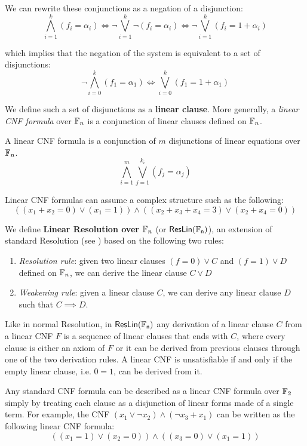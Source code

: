 \noindent
We can rewrite these conjunctions as a negation of a disjunction:
\[\bigwedge_{i = 1}^k (f_i = \alpha_i) \iff \lnot \bigvee_{i = 1}^k \lnot (f_i = \alpha_i) \iff \lnot \bigvee_{i = 1}^k (f_i = 1 + \alpha_i)\]

\noindent
which implies that the negation of the system is equivalent to a set of disjunctions:
\[\lnot \bigwedge_{i = 0}^k (f_1 = \alpha_1) \iff \bigvee_{i = 0}^k (f_1 = 1 + \alpha_1)\]

\noindent
We define such a set of disjunctions as a \textbf{linear clause}. More generally, a \textit{linear CNF formula} over $\mathbb{F}_n$ is a conjunction of linear clauses defined on $\mathbb{F}_n$.

\begin{definition}
 A linear CNF formula is a conjunction of $m$ disjunctions of linear equations over $\mathbb{F}_n$.
    \[\bigwedge_{i = 1}^m \bigvee_{j = 1}^{k_i} (f_j = \alpha_j)\]
\end{definition}

Linear CNF formulas can assume a complex structure such as the following:
\[((x_1+x_2 = 0) \lor (x_1 = 1)) \land ((x_2 + x_3 + x_4 = 3) \lor (x_2 + x_4 = 0))\]

We define \textbf{Linear Resolution over $\mathbb{F}_n$} (or $\mathsf{ResLin(\mathbb{F}_n)}$), an extension of standard Resolution (see ) based on the following two rules:
\begin{enumerate}
    \item \textit{Resolution rule}: given two linear clauses $(f = 0) \lor C$ and $(f = 1) \lor D$ defined on $\mathbb{F}_n$, we can derive the linear clause $C \lor D$
    \item \textit{Weakening rule}: given a linear clause $C$, we can derive any linear clause $D$ such that $C \implies D$.
\end{enumerate}

Like in normal Resolution, in $\mathsf{ResLin(\mathbb{F}_n)}$ any derivation of a linear clause $C$ from a linear CNF $F$ is a sequence of linear clauses that ends with $C$, where every clause is either an axiom of $F$ or it can be derived from previous clauses through one of the two derivation rules. A linear CNF is unsatisfiable if and only if the empty linear clause, i.e. $0 = 1$, can be derived from it. 

Any standard CNF formula can be described as a linear CNF formula over $\mathbb{F}_2$ simply by treating each clause as a disjunction of linear forms made of a single term. For example, the CNF $(x_1 \lor \lnot{x_2}) \land (\lnot{x_3} + x_1)$ can be written as the following linear CNF formula:
\[((x_1 = 1) \lor (x_2 = 0)) \land ((x_3 = 0) \lor (x_1 = 1))\]

